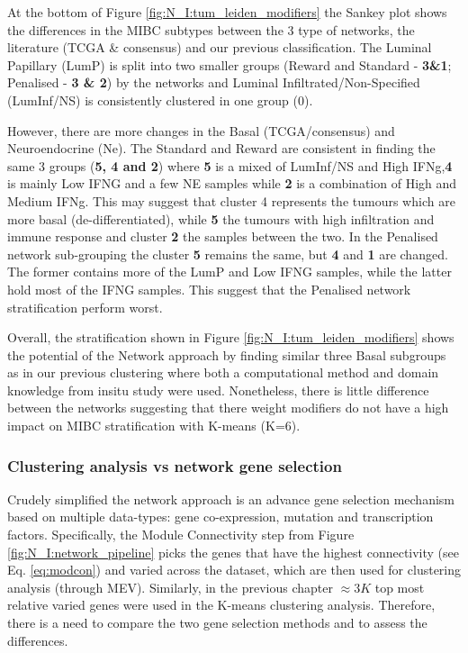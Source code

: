 At the bottom of Figure \ref{fig:N_I:tum_leiden_modifiers} the Sankey plot shows the differences in the MIBC subtypes between the 3 type of networks, the literature (TCGA \& consensus) and our previous classification. The Luminal Papillary (LumP) is split into two smaller groups (Reward and Standard - \textbf{3\&1}; Penalised - \textbf{3 \& 2}) by the networks and Luminal Infiltrated/Non-Specified (LumInf/NS) is consistently clustered in one group (0). 

However, there are more changes in the Basal (TCGA/consensus) and Neuroendocrine (Ne). The Standard and Reward are consistent in finding the same 3 groups (\textbf{5, 4 and 2}) where \textbf{5} is a mixed of LumInf/NS and High IFNg,\textbf{4} is mainly Low IFNG and a few NE samples while \textbf{2} is a combination of High and Medium IFNg. This may suggest that cluster 4 represents the tumours which are more basal (de-differentiated), while \textbf{5} the tumours with high infiltration and immune response and cluster \textbf{2} the samples between the two. In the Penalised network sub-grouping the cluster \textbf{5} remains the same, but \textbf{4} and \textbf{1} are changed. The former contains more of the LumP and Low IFNG samples, while the latter hold most of the IFNG samples. This suggest that the Penalised network stratification perform worst.

Overall, the stratification shown in Figure \ref{fig:N_I:tum_leiden_modifiers} shows the potential of the Network approach by finding similar three Basal subgroups as in our previous clustering where both a computational method and domain knowledge from insitu study\citet{Baker2022-bj} were used. Nonetheless, there is little difference between the networks suggesting that there weight modifiers do not have a high impact on MIBC stratification with K-means (K=6).

\subsubsection{Clustering analysis vs network gene selection} \label{s:N_I:cs_vs_gene_sel}

Crudely simplified the network approach is an advance gene selection mechanism based on multiple data-types: gene co-expression, mutation and transcription factors. Specifically, the Module Connectivity step from Figure \ref{fig:N_I:network_pipeline} picks the genes that have the highest connectivity (see Eq. \ref{eq:modcon}) and varied across the dataset, which are then used for clustering analysis (through MEV). Similarly, in the previous chapter $\approx3K$ top most relative varied genes were used in the K-means clustering analysis. Therefore, there is a need to compare the two gene selection methods and to assess the differences.

